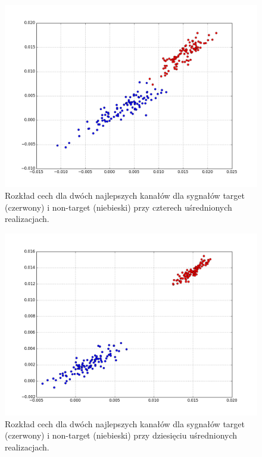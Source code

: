 \documentclass[licencjacka,openright]{pracamgr}
\begin{document}
\begin{figure}[H]
\centering
\includegraphics[scale=0.55, trim=10mm 15mm 10mm 18mm, clip=True]{pics/cecha_toz_4.png}
\caption{Rozkład cech dla dwóch najlepszych kanałów dla sygnałów target (czerwony) i non-target (niebieski) przy czterech uśrednionych realizacjach.}
\label{cecha_toz_4}
\end{figure}

\begin{figure}[H]
\centering
\includegraphics[scale=0.55, trim=10mm 15mm 10mm 18mm, clip=True]{pics/cecha_toz_10.png}
\caption{Rozkład cech dla dwóch najlepszych kanałów dla sygnałów target (czerwony) i non-target (niebieski) przy dziesięciu uśrednionych realizacjach.}
\label{cecha_toz_10}
\end{figure}
\end{document}
